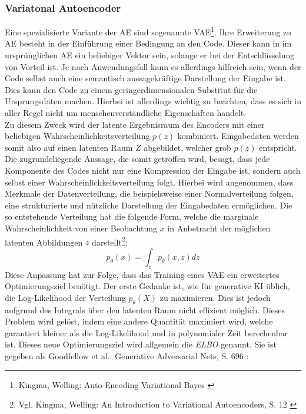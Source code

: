 \subsubsection{Variatonal Autoencoder}

Eine spezialisierte Variante der \ac{AE} sind sogenannte \ac{VAE}\footnote{
    Kingma, Welling: Auto-Encoding Variational Bayes
    \cite{kingma2013auto}
}. Ihre Erweiterung zu \ac{AE} besteht in der Einführung einer Bedingung an den Code. Dieser kann in im ursprünglichen \ac{AE} ein beliebiger Vektor sein, solange er bei der Entschlüsselung von Vorteil ist. Je nach Anwendungsfall kann es allerdings hilfreich sein, wenn der Code selbst auch eine semantisch aussagekräftige Darstellung der Eingabe ist. Dies kann den Code zu einem geringerdimensionalen Substitut für die Ursprungsdaten machen. Hierbei ist allerdings wichtig zu beachten, dass es sich in aller Regel nicht um menschenverständliche Eigenschaften handelt. \\
Zu diesem Zweck wird der latente Ergebnisraum des Encoders mit einer beliebigen Wahrscheinlichkeitsverteilung $p(z)$ kombiniert. Eingabedaten werden somit also auf einen latenten Raum $Z$ abgebildet, welcher grob $p(z)$ entspricht. \\
Die zugrundeliegende Aussage, die somit getroffen wird, besagt, dass jede Komponente des Codes nicht nur eine Kompression der Eingabe ist, sondern auch selbst einer Wahrscheinlichkeitsverteilung folgt. Hierbei wird angenommen, dass Merkmale der Datenverteilung, die beispielsweise einer Normalverteilung folgen, eine strukturierte und nützliche Darstellung der Eingabedaten ermöglichen. Die so entstehende Verteilung hat die folgende Form, welche die marginale Wahrscheinlichkeit von einer Beobachtung $x$ in Anbetracht der möglichen latenten Abbildungen $z$ darstellt\footnote{
    Vgl. Kingma, Welling: An Introduction to Variational Autoencoders, S. 12
    \cite{Kingma_2019}
}:
\begin{equation}
    p_\theta(x) = \int_z p_\theta(x, z) dz
\end{equation}
Diese Anpassung hat zur Folge, dass das Training eines \ac{VAE} ein erweitertes Optimierungsziel benötigt. Der erste Gedanke ist, wie für generative \ac{KI} üblich, die Log-Likelihood der Verteilung $p_\theta(X)$ zu maximieren. Dies ist jedoch aufgrund des Integrals über den latenten Raum nicht effizient möglich. Dieses Problem wird gelöst, indem eine andere Quantität maximiert wird, welche garantiert kleiner als die Log-Likelihood und in polynomialer Zeit berechenbar ist. Dieses neue Optimierungsziel wird allgemein die \textit{\ac{ELBO}} genannt. Sie ist gegeben als{
    Goodfellow et al.: Generative Adversarial Nets, S. 696
    \cite{goodfellow2014generativeadversarialnetworks}
}:
